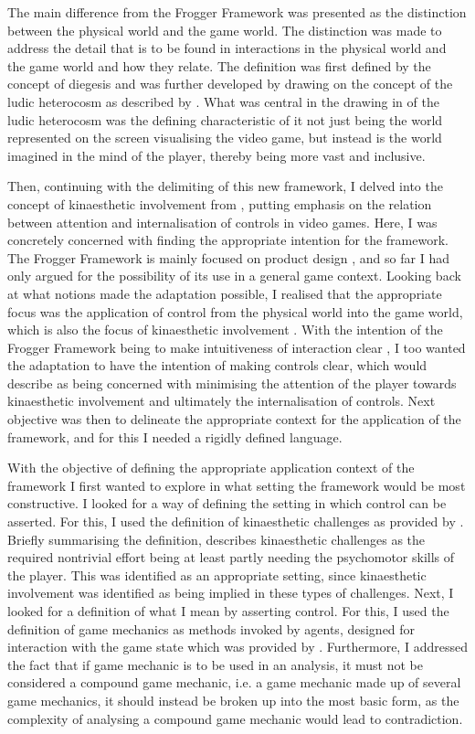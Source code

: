 The main difference from the Frogger Framework was presented as the distinction between the physical world and the game world. The distinction was made to address the detail that is to be found in interactions in the physical world and the game world and how they relate. The definition was first defined by the concept of diegesis \cite{bordwell} and was further developed by drawing on the concept of the ludic heterocosm as described by . What was central in the drawing in of the ludic heterocosm was the defining characteristic of it not just being the world represented on the screen visualising the video game, but instead is the world imagined in the mind of the player, thereby being more vast and inclusive.

Then, continuing with the delimiting of this new framework, I delved into the concept of kinaesthetic involvement from , putting emphasis on the relation between attention and internalisation of controls in video games. Here, I was concretely concerned with finding the appropriate intention for the framework. The Frogger Framework is mainly focused on product design \cite{frogger}, and so far I had only argued for the possibility of its use in a general game context. Looking back at what notions made the adaptation possible, I realised that the appropriate focus was the application of control from the physical world into the game world, which is also the focus of kinaesthetic involvement \cite{calleja}. With the intention of the Frogger Framework being to make intuitiveness of interaction clear \cite{frogger}, I too wanted the adaptation to have the intention of making controls clear, which  would describe as being concerned with minimising the attention of the player towards kinaesthetic involvement and ultimately the internalisation of controls. Next objective was then to delineate the appropriate context for the application of the framework, and for this I needed a rigidly defined language.

With the objective of defining the appropriate application context of the framework I first wanted to explore in what setting the framework would be most constructive. I looked for a way of defining the setting in which control can be asserted. For this, I used the definition of kinaesthetic challenges as provided by . Briefly summarising the definition,  describes kinaesthetic challenges as the required nontrivial effort being at least partly needing the psychomotor skills of the player. This was identified as an appropriate setting, since kinaesthetic involvement was identified as being implied in these types of challenges. Next, I looked for a definition of what I mean by asserting control. For this, I used the definition of game mechanics as methods invoked by agents, designed for interaction with the game state which was provided by . Furthermore, I addressed the fact that if game mechanic is to be used in an analysis, it must not be considered a compound game mechanic, i.e. a game mechanic made up of several game mechanics, it should instead be broken up into the most basic form, as the complexity of analysing a compound game mechanic would lead to contradiction.

